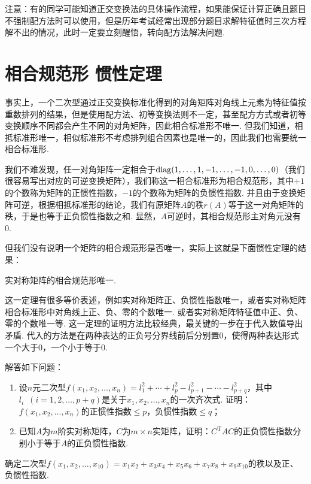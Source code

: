 注意：有的同学可能知道正交变换法的具体操作流程，如果能保证计算正确且题目不强制配方法时可以使用，但是历年考试经常出现部分题目求解特征值时三次方程解不出的情况，此时一定要立刻醒悟，转向配方法解决问题.

\section{相合规范形 \quad 惯性定理}

事实上，一个二次型通过正交变换标准化得到的对角矩阵对角线上元素为特征值按重数排列的结果，但是使用配方法、初等变换法则不一定，甚至配方方式或者初等变换顺序不同都会产生不同的对角矩阵，因此相合标准形不唯一. 但我们知道，相抵标准形唯一，相似标准形不考虑排列组合因素也是唯一的，因此我们也需要统一相合标准形.

我们不难发现，任一对角矩阵一定相合于$\operatorname{diag}(1,\ldots,1,-1,\ldots,-1,0,\ldots,0)$（我们很容易写出对应的可逆变换矩阵），我们称这一相合标准形为相合规范形，其中$+1$的个数称为矩阵的正惯性指数，$-1$的个数称为矩阵的负惯性指数. 并且由于变换矩阵可逆，根据相抵标准形的结论，我们有原矩阵$A$的秩$r(A)$等于这一对角矩阵的秩，于是也等于正负惯性指数之和. 显然，$A$可逆时，其相合规范形主对角元没有0.

但我们没有说明一个矩阵的相合规范形是否唯一，实际上这就是下面惯性定理的结果：
\begin{theorem}[惯性定理]
    实对称矩阵的相合规范形唯一.
\end{theorem}
这一定理有很多等价表述，例如实对称矩阵正、负惯性指数唯一，或者实对称矩阵相合标准形中对角线上正、负、零的个数唯一. 或者实对称矩阵特征值中正、负、零的个数唯一等. 这一定理的证明方法比较经典，最关键的一步在于代入数值导出矛盾. 代入的方法是在两种表达的正负号分界线前后分别置0，使得两种表达形式一个大于0，一个小于等于0.
\begin{example}
    解答如下问题：
    \begin{enumerate}
        \item 设$n$元二次型$f(x_1,x_2,\ldots,x_n)=l_1^2+\cdots+l_p^2-l_{p+1}^2-\cdots-l_{p+q}^2$，其中$l_i\enspace (i=1,2,\ldots,p+q)$是关于$x_1,x_2,\ldots,x_n$的一次齐次式. 证明：$f(x_1,x_2,\ldots,x_n)$的正惯性指数$\leqslant p$，负惯性指数$\leqslant q$；

        \item 已知$A$为$m$阶实对称矩阵，$C$为$m\times n$实矩阵，证明：$C^\mathrm{T}AC$的正负惯性指数分别小于等于$A$的正负惯性指数.
    \end{enumerate}
\end{example}

\begin{example}
    确定二次型$f(x_1,x_2,\ldots,x_{10})=x_1x_2+x_3x_4+x_5x_6+x_7x_8+x_9x_{10}$的秩以及正、负惯性指数.
\end{example}

